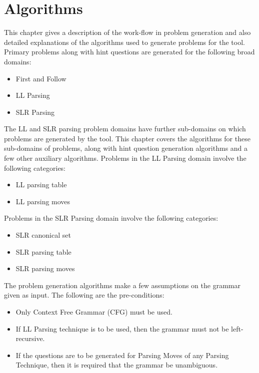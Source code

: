\chapter{Algorithms}
\label{chap:algorithms}
This chapter gives a description of the work-flow in problem generation and also detailed explanations of the algorithms used to generate problems for the tool. Primary problems along with hint questions are generated for the following broad domains:
\begin{itemize}
\item First and Follow
\item LL Parsing
\item SLR Parsing
\end{itemize}
The LL and SLR parsing problem domains have further sub-domains on which problems are generated by the tool. This chapter covers the algorithms for these sub-domains of problems, along with hint question generation algorithms and a few other auxiliary algorithms.
Problems in the LL Parsing domain involve the following categories:
\begin{itemize}
\item LL parsing table
\item LL parsing moves
\end{itemize}
Problems in the SLR Parsing domain involve the following categories:
\begin{itemize}
\item SLR canonical set
\item SLR parsing table
\item SLR parsing moves
\end{itemize}

The problem generation algorithms make a few assumptions on the grammar given as input. The following are the pre-conditions:
\begin{itemize}
\item Only Context Free Grammar (CFG) must be used.
\item If LL Parsing technique is to be used, then the grammar must not be left-recursive.
\item If the questions are to be generated for Parsing Moves of any Parsing Technique, then it is required that the grammar be unambiguous.
\end{itemize}

